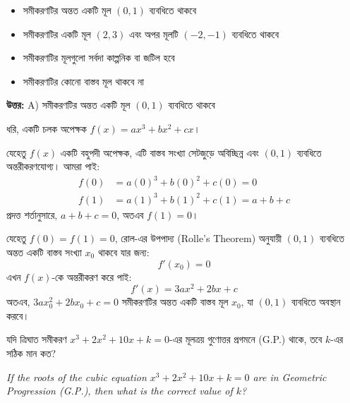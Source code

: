 \documentclass[12pt, a4paper]{article}
\begin{document}
\begin{itemize}[label={}, leftmargin=1cm, itemsep=0.5em]
    \item[\textbf{A)}] সমীকরণটির অন্তত একটি মূল $(0, 1)$ ব্যবধিতে থাকবে
    \item[\textbf{B)}] সমীকরণটির একটি মূল $(2, 3)$ এবং অপর মূলটি $(-2, -1)$ ব্যবধিতে থাকবে
    \item[\textbf{C)}] সমীকরণটির মূলগুলো সর্বদা কাল্পনিক বা জটিল হবে
    \item[\textbf{D)}] সমীকরণটির কোনো বাস্তব মূল থাকবে না
\end{itemize}

\vspace{0.5em}
\begin{tcolorbox}[answerbox]
    \textbf{\color{success} উত্তর:} A) সমীকরণটির অন্তত একটি মূল $(0, 1)$ ব্যবধিতে থাকবে
\end{tcolorbox}
\vspace{1em}

\begin{tcolorbox}[solutionbox={সমাধান (Solution)}]
    \noindent
    ধরি, একটি চলক অপেক্ষক $f(x) = ax^3 + bx^2 + cx$। 
    
    যেহেতু $f(x)$ একটি বহুপদী অপেক্ষক, এটি বাস্তব সংখ্যা সেটজুড়ে অবিচ্ছিন্ন এবং $(0, 1)$ ব্যবধিতে অন্তরীকরণযোগ্য। আমরা পাই:
    \begin{align*}
        f(0) &= a(0)^3 + b(0)^2 + c(0) = 0 \\
        f(1) &= a(1)^3 + b(1)^2 + c(1) = a + b + c
    \end{align*}
    প্রদত্ত শর্তানুসারে, $a+b+c = 0$, অতএব $f(1) = 0$। 
    
    যেহেতু $f(0) = f(1) = 0$, রোল-এর উপপাদ্য (Rolle's Theorem) অনুযায়ী $(0, 1)$ ব্যবধিতে অন্তত একটি বাস্তব সংখ্যা $x_0$ থাকবে যার জন্য:
    \[ f'(x_0) = 0 \]
    এখন $f(x)$-কে অন্তরীকরণ করে পাই:
    \[ f'(x) = 3ax^2 + 2bx + c \]
    অতএব, $3ax_0^2 + 2bx_0 + c = 0$ সমীকরণটির অন্তত একটি বাস্তব মূল $x_0$, যা $(0, 1)$ ব্যবধিতে অবস্থান করবে।
\end{tcolorbox}

\vspace{1em}

\begin{tcolorbox}[questionbox={প্রশ্ন (Question) 27}]
    \noindent
    যদি ত্রিঘাত সমীকরণ $x^3 + 2x^2 + 10x + k = 0$-এর মূলত্রয় গুণোত্তর প্রগমনে (G.P.) থাকে, তবে $k$-এর সঠিক মান কত?
    
    \vspace{0.8em}
    \begin{english}
    \noindent\textit{\color{darkgray}
    If the roots of the cubic equation $x^3 + 2x^2 + 10x + k = 0$ are in Geometric Progression (G.P.), then what is the correct value of $k$?
    }
    \end{english}
\end{tcolorbox}
\end{document}

